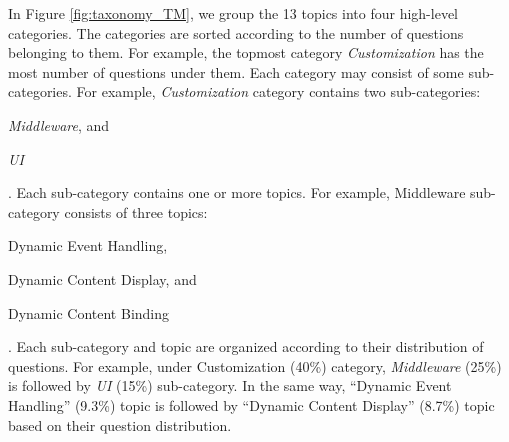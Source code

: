 In Figure \ref{fig:taxonomy_TM}, we group the 13 topics into four high-level categories. The categories are sorted according to the number of
questions belonging to them. For example, the topmost category \textit{Customization} has the most number of questions under them. Each category may consist of some
sub-categories. For example, \textit{Customization} category contains two sub-categories:
\begin{inparaenum}[(1)]
\item \textit{Middleware}, and
\item \textit{UI}
\end{inparaenum}. Each sub-category contains one or more topics. For example,
Middleware sub-category consists of three topics: \begin{inparaenum}[(1)] \item
Dynamic Event Handling, \item Dynamic Content Display, and \item Dynamic Content Binding\end{inparaenum}. Each sub-category and topic are organized according to
their distribution of questions. For example, under Customization (40\%)
category, \textit{Middleware} (25\%) is followed by \textit{UI} (15\%) sub-category. In the same
way, ``Dynamic Event Handling'' (9.3\%) topic is followed by ``Dynamic Content
Display'' (8.7\%) topic based on their question distribution.






